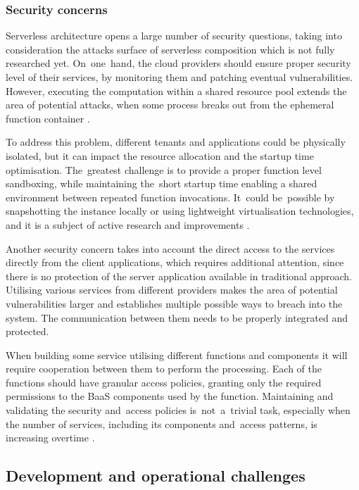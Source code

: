 \subsubsection{Security concerns} \label{chapter:serverless-security-concerns}

Serverless architecture opens a large number of security questions, taking into consideration the attacks surface of serverless composition which is not fully researched yet. On~one~hand, the cloud providers should ensure proper security level of their services, by monitoring them and patching eventual vulnerabilities. However, executing the computation within a shared resource pool extends the area of potential attacks, when some process breaks out from the ephemeral function container \cite{LeveragingServerlessCloudComputingArchitectures}.

To address this problem, different tenants and applications could be physically isolated, but it can impact the resource allocation and the startup time optimisation. The~greatest challenge is to provide a proper function level sandboxing, while maintaining the~short startup time enabling a shared environment between repeated function invocations. It~could be~possible by snapshotting the instance locally or using lightweight virtualisation technologies, and it is a subject of active research and improvements \cite{BerkeleyServerless}.

Another security concern takes into account the direct access to the services directly from the client applications, which requires additional attention, since there is no protection of the server application available in traditional approach. Utilising various services from different providers makes the area of potential vulnerabilities larger and establishes multiple possible ways to breach into the system. The communication between them needs to be properly integrated and protected.

When building some service utilising different functions and components it will require cooperation between them to perform the processing. Each of the functions should have granular access policies, granting only the required permissions to the BaaS components used by the function. Maintaining and validating the security and~access policies is~not~a~trivial task, especially when the number of services, including its components and~access patterns, is increasing overtime \cite{MartinFowlerServerless}.

\subsection{Development and operational challenges} \label{chapter:serverless-development-and-operational-challenges}

